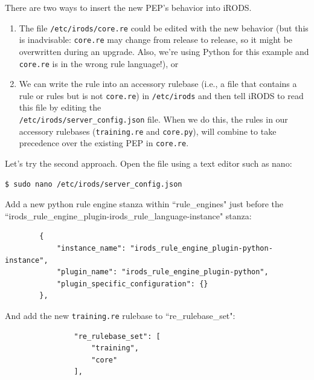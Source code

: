 \documentclass[10pt,oneside]{memoir}
\begin{document}
There are two ways to insert the new PEP's behavior into iRODS.
\begin{enumerate}
 \item The file \texttt{/etc/irods/core.re} could be edited with the new behavior (but this is inadvisable: \texttt{core.re} may change from release to release, so it might be overwritten during an upgrade.  Also, we're using Python for this example and \texttt{core.re} is in the wrong rule language!), or
 \item We can write the rule into an accessory rulebase (i.e., a file that contains a rule or rules but is not \texttt{core.re}) in \texttt{/etc/irods} and then tell iRODS to read this file by editing the \\ \texttt{/etc/irods/server\_config.json} file. When we do this, the rules in our accessory rulebases (\texttt{training.re} and \texttt{core.py}), will combine to take precedence over the existing PEP in \texttt{core.re}.
\end{enumerate}

Let's try the second approach. Open the file using a text editor such as nano:

\begin{lstlisting}
$ sudo nano /etc/irods/server_config.json
\end{lstlisting}

Add a new python rule engine stanza within ``rule\_engines" just before the ``irods\_rule\_engine\_plugin-irods\_rule\_language-instance" stanza:

\begin{lrbox}{\lstServerConfigA}
\begin{lstlisting}
        {
            "instance_name": "irods_rule_engine_plugin-python-instance",
            "plugin_name": "irods_rule_engine_plugin-python",
            "plugin_specific_configuration": {}
        },
\end{lstlisting}
\end{lrbox}
\href{https://github.com/irods/irods_training/blob/ugm2026/beginner/server_config.json#L41-L45}{\usebox{\lstServerConfigA}}

And add the new \texttt{training.re} rulebase to ``re\_rulebase\_set":

\begin{lrbox}{\lstServerConfigB}
\begin{lstlisting}
                "re_rulebase_set": [
                    "training",
                    "core"
                ],
\end{lstlisting}
\end{lrbox}
\href{https://github.com/irods/irods_training/blob/ugm2026/beginner/server_config.json#L56-L59}{\usebox{\lstServerConfigB}}
\end{document}
